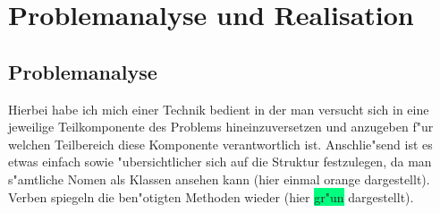 \section{Problemanalyse und Realisation}
\subsection{Problemanalyse}
Hierbei habe ich mich einer Technik bedient in der man versucht sich in eine jeweilige Teilkomponente des Problems hineinzuversetzen und anzugeben f"ur welchen Teilbereich diese Komponente verantwortlich ist. Anschlie"send ist es etwas einfach sowie "ubersichtlicher sich auf die Struktur festzulegen, da man s"amtliche Nomen als Klassen ansehen kann (hier einmal \colorbox{Apricot}{orange} dargestellt). Verben spiegeln die ben"otigten Methoden wieder (hier \colorbox{SpringGreen}{gr"un} dargestellt).

